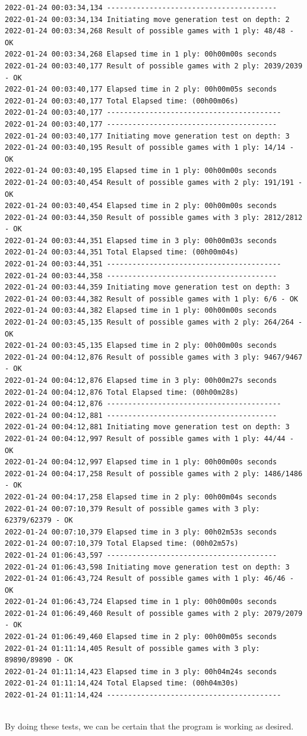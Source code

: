 \documentclass[10pt]{article}
\begin{document}
\begin{lstlisting}
2022-01-24 00:03:34,134 ----------------------------------------
2022-01-24 00:03:34,134 Initiating move generation test on depth: 2
2022-01-24 00:03:34,268 Result of possible games with 1 ply: 48/48 - OK
2022-01-24 00:03:34,268 Elapsed time in 1 ply: 00h00m00s seconds
2022-01-24 00:03:40,177 Result of possible games with 2 ply: 2039/2039 - OK
2022-01-24 00:03:40,177 Elapsed time in 2 ply: 00h00m05s seconds
2022-01-24 00:03:40,177 Total Elapsed time: (00h00m06s)
2022-01-24 00:03:40,177 -----------------------------------------
2022-01-24 00:03:40,177 ----------------------------------------
2022-01-24 00:03:40,177 Initiating move generation test on depth: 3
2022-01-24 00:03:40,195 Result of possible games with 1 ply: 14/14 - OK
2022-01-24 00:03:40,195 Elapsed time in 1 ply: 00h00m00s seconds
2022-01-24 00:03:40,454 Result of possible games with 2 ply: 191/191 - OK
2022-01-24 00:03:40,454 Elapsed time in 2 ply: 00h00m00s seconds
2022-01-24 00:03:44,350 Result of possible games with 3 ply: 2812/2812 - OK
2022-01-24 00:03:44,351 Elapsed time in 3 ply: 00h00m03s seconds
2022-01-24 00:03:44,351 Total Elapsed time: (00h00m04s)
2022-01-24 00:03:44,351 -----------------------------------------
2022-01-24 00:03:44,358 ----------------------------------------
2022-01-24 00:03:44,359 Initiating move generation test on depth: 3
2022-01-24 00:03:44,382 Result of possible games with 1 ply: 6/6 - OK
2022-01-24 00:03:44,382 Elapsed time in 1 ply: 00h00m00s seconds
2022-01-24 00:03:45,135 Result of possible games with 2 ply: 264/264 - OK
2022-01-24 00:03:45,135 Elapsed time in 2 ply: 00h00m00s seconds
2022-01-24 00:04:12,876 Result of possible games with 3 ply: 9467/9467 - OK
2022-01-24 00:04:12,876 Elapsed time in 3 ply: 00h00m27s seconds
2022-01-24 00:04:12,876 Total Elapsed time: (00h00m28s)
2022-01-24 00:04:12,876 -----------------------------------------
2022-01-24 00:04:12,881 ----------------------------------------
2022-01-24 00:04:12,881 Initiating move generation test on depth: 3
2022-01-24 00:04:12,997 Result of possible games with 1 ply: 44/44 - OK
2022-01-24 00:04:12,997 Elapsed time in 1 ply: 00h00m00s seconds
2022-01-24 00:04:17,258 Result of possible games with 2 ply: 1486/1486 - OK
2022-01-24 00:04:17,258 Elapsed time in 2 ply: 00h00m04s seconds
2022-01-24 00:07:10,379 Result of possible games with 3 ply: 62379/62379 - OK
2022-01-24 00:07:10,379 Elapsed time in 3 ply: 00h02m53s seconds
2022-01-24 00:07:10,379 Total Elapsed time: (00h02m57s)
2022-01-24 01:06:43,597 ----------------------------------------
2022-01-24 01:06:43,598 Initiating move generation test on depth: 3
2022-01-24 01:06:43,724 Result of possible games with 1 ply: 46/46 - OK
2022-01-24 01:06:43,724 Elapsed time in 1 ply: 00h00m00s seconds
2022-01-24 01:06:49,460 Result of possible games with 2 ply: 2079/2079 - OK
2022-01-24 01:06:49,460 Elapsed time in 2 ply: 00h00m05s seconds
2022-01-24 01:11:14,405 Result of possible games with 3 ply: 89890/89890 - OK
2022-01-24 01:11:14,423 Elapsed time in 3 ply: 00h04m24s seconds
2022-01-24 01:11:14,424 Total Elapsed time: (00h04m30s)
2022-01-24 01:11:14,424 -----------------------------------------
    
\end{lstlisting}

By doing these tests, we can be certain that the program is working as desired.
\end{document}
